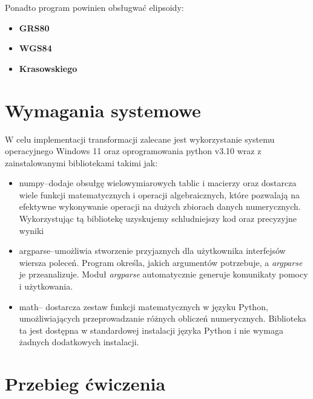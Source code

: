 \documentclass[a4paper,titleauthor]{mwart}
\begin{document}
\vspace{0.5cm}
Ponadto program powinien obsługwać elipsoidy:
\begin{itemize}
    \item \textbf{GRS80}
    \item \textbf{WGS84}
    \item \textbf{Krasowskiego}
\end{itemize}
\section{Wymagania systemowe}
W celu implementacji transformacji zalecane jest wykorzystanie systemu operacyjnego Windows 11 oraz oprogramowania python v3.10 wraz z zainstalowanymi bibliotekami takimi jak:
\begin{itemize}
    \item numpy--dodaje obsułgę wielowymiarowych tablic i macierzy oraz dostarcza wiele funkcji matematycznych i operacji algebraicznych, które pozwalają na efektywne wykonywanie operacji na dużych zbiorach danych numerycznych. Wykorzystując tą bibliotekę uzyskujemy schludniejszy kod oraz precyzyjne wyniki
    \begin{flushright}
        \cite{numpy}
    \end{flushright}
    \item argparse--umożliwia stworzenie przyjaznych dla użytkownika interfejsów wiersza poleceń. Program określa, jakich argumentów potrzebuje, a \textit{argparse} je przeanalizuje. Moduł \textit{argparse} automatycznie generuje komunikaty pomocy i użytkowania.
    \begin{flushright}
        \cite{argparse}
    \end{flushright}
    \item math-- dostarcza zestaw funkcji matematycznych w języku Python, umożliwiających przeprowadzanie różnych obliczeń numerycznych. Biblioteka ta jest dostępna w standardowej instalacji języka Python i nie wymaga żadnych dodatkowych instalacji.
    \begin{flushright}
        \cite{math}
    \end{flushright}
\end{itemize}

\section{Przebieg ćwiczenia}
\end{document}
